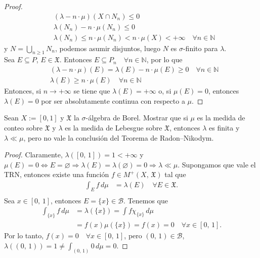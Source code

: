 \documentclass[12pt]{article}
\newenvironment{statement}[2][Ejercicio]{\begin{trivlist}
\item[\hskip \labelsep {\bfseries #1}\hskip \labelsep {\bfseries #2.}]}{\end{trivlist}}
\begin{document}
\begin{proof}
    \begin{align*}
         & (\lambda - n \cdot \mu)(X \cap N_n) \leq 0                                                   \\
         & \lambda(N_n) - n \cdot \mu(N_n) \leq 0                                                       \\
         & \lambda(N_n) \leq n \cdot \mu(N_n) < n \cdot \mu(X) < +\infty \quad \forall n \in \mathbb{N}
    \end{align*} y $N = \bigcup_{n \geq 1} N_n$, podemos asumir disjuntos, luego $N$ es $\sigma$-finito para $\lambda$. \\
    Sea $E \subseteq P$, $E \in \mathfrak{X}$. Entonces $E \subseteq P_n \quad \forall n \in \mathbb{N}$, por lo que \begin{align*}
         & (\lambda - n \cdot \mu)(E) = \lambda(E) - n \cdot \mu(E) \geq 0 \quad \forall n \in \mathbb{N} \\
         & \lambda(E) \geq n \cdot \mu(E) \quad \forall n \in \mathbb{N}
    \end{align*} Entonces, si $n \to +\infty$ se tiene que $\lambda(E) = +\infty$ o, si $\mu(E) = 0$, entonces $\lambda(E) = 0$ por ser absolutamente continua con respecto a $\mu$.
\end{proof}

\begin{statement}{6}
    Sean $X := [0,1]$ y $\mathfrak{X}$ la $\sigma$-álgebra de Borel. Mostrar que si $\mu$ es la medida de conteo sobre $\mathfrak{X}$ y $\lambda$ es la medida de Lebesgue sobre $\mathfrak{X}$, entonces $\lambda$ es finita y $\lambda \ll \mu$, pero no vale la conclusión del Teorema de Radon–Nikodym.
\end{statement}

\begin{proof}
    Claramente, $\lambda([0\text{, }1]) = 1 < +\infty$ y $\mu(E) = 0 \iff E = \varnothing \Rightarrow \lambda(E) = \lambda(\varnothing) = 0 \Rightarrow \lambda \ll \mu$. Supongamos que vale el TRN, entonces existe una función $f \in M^+(X\text{, } \mathfrak{X})$ tal que \begin{align*}
        \int_E f \, d\mu & = \lambda(E) \quad \forall E \in \mathfrak{X}. \\
    \end{align*} Sea $x \in [0\text{, }1]$, entonces $E = \{x\} \in \mathcal{B}$. Tenemos que \begin{align*}
        \int_{\{x\}} f \, d\mu & = \lambda(\{x\}) = \int f \chi_{\{x\}} \, d\mu                  \\
                               & = f(x) \mu(\{x\}) = f(x) = 0 \quad \forall x \in [0\text{, }1].
    \end{align*} Por lo tanto, $f(x) = 0 \quad \forall x \in [0\text{, }1]$, pero $(0\text{, }1) \in \mathcal{B}$, $\lambda((0\text{, }1)) = 1 \neq \int_{(0\text{, }1)} 0 \, d\mu = 0$.
\end{proof}
\end{document}
